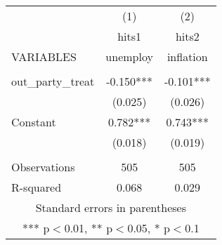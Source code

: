 \documentclass[]{article}
\begin{document}
\begin{tabular}{lcc} \hline
 & (1) & (2) \\
 & hits1 & hits2 \\
VARIABLES & unemploy & inflation \\ \hline
 &  &  \\
out\_party\_treat & -0.150*** & -0.101*** \\
 & (0.025) & (0.026) \\
Constant & 0.782*** & 0.743*** \\
 & (0.018) & (0.019) \\
 &  &  \\
Observations & 505 & 505 \\
 R-squared & 0.068 & 0.029 \\ \hline
\multicolumn{3}{c}{ Standard errors in parentheses} \\
\multicolumn{3}{c}{ *** p$<$0.01, ** p$<$0.05, * p$<$0.1} \\
\end{tabular}
\end{document}
